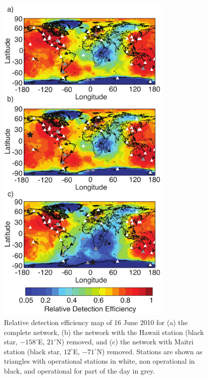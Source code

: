 \begin{figure}[ht!]
   \centering
\noindent\includegraphics[width=20pc]{efficiency/Figures/2012RS005049-p12.pdf} 
   \caption{Relative detection efficiency map of 16 June 2010  for (a) the complete network, (b) the network with the Hawaii station (black star, $-158^\circ$E, $21^\circ$N) removed, and (c) the network with Maitri station (black star, $12^\circ$E, $-71^\circ$N) removed.
Stations are shown as triangles with operational stations in white, non operational in black, and operational for part of the day in grey.}
   \label{efficiency:fig:scrubMap}
\end{figure}


